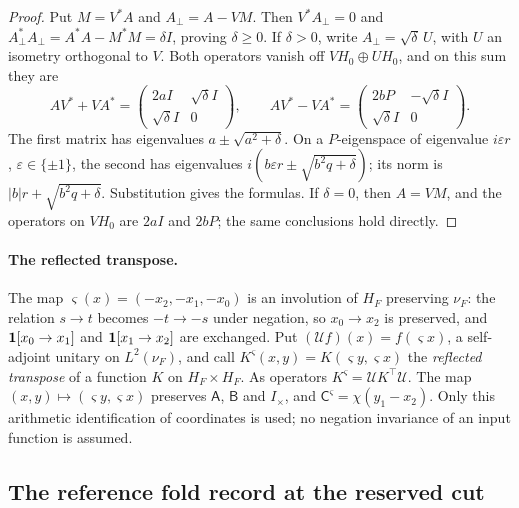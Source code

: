 \begin{proof}
Put $M=V^*A$ and $A_\perp=A-VM$. Then $V^*A_\perp=0$ and
$A_\perp^*A_\perp=A^*A-M^*M=\delta I$, proving $\delta\ge0$.
If $\delta>0$, write $A_\perp=\sqrt\delta\,U$, with $U$ an isometry
orthogonal to $V$. Both operators vanish off $VH_0\oplus UH_0$, and on
this sum they are
\[
 AV^*+VA^*=\begin{pmatrix}2aI&\sqrt\delta I\\\sqrt\delta I&0\end{pmatrix},
 \qquad
 AV^*-VA^*=\begin{pmatrix}2bP&-\sqrt\delta I\\\sqrt\delta I&0\end{pmatrix}.
\]
The first matrix has eigenvalues $a\pm\sqrt{a^2+\delta}$.
On a $P$-eigenspace of eigenvalue $i\varepsilon r$, $\varepsilon\in\{\pm1\}$,
the second has eigenvalues
$i(b\varepsilon r\pm\sqrt{b^2q+\delta})$; its norm is
$|b|r+\sqrt{b^2q+\delta}$. Substitution gives the formulas. If $\delta=0$,
then $A=VM$, and the operators on $VH_0$ are $2aI$ and $2bP$;
the same conclusions hold directly.
\end{proof}

\paragraph{The reflected transpose.}
The map $\varsigma(x)=(-x_2,-x_1,-x_0)$ is an involution of $H_F$ preserving
$\nu_F$: the relation $s\to t$ becomes $-t\to-s$ under negation, so
$x_0\to x_2$ is preserved, and $\mathbf 1[x_0\to x_1]$ and $\mathbf 1[x_1\to x_2]$ are
exchanged. Put $(\mathcal Uf)(x)=f(\varsigma x)$, a self-adjoint unitary on
$L^2(\nu_F)$, and call $K^\varsigma(x,y)=K(\varsigma y,\varsigma x)$ the
\emph{reflected transpose} of a function $K$ on $H_F\times H_F$. As operators
$K^\varsigma=\mathcal UK^\top\mathcal U$. The map
$(x,y)\mapsto(\varsigma y,\varsigma x)$ preserves $\mathsf A$, $\mathsf B$ and
$I_\times$, and $\mathsf C^\varsigma=\chi(y_1-x_2)$. Only this arithmetic
identification of coordinates is used; no negation invariance of an input
function is assumed.

\subsection{The reference fold record at the reserved cut}\label{subsec:old-f}

